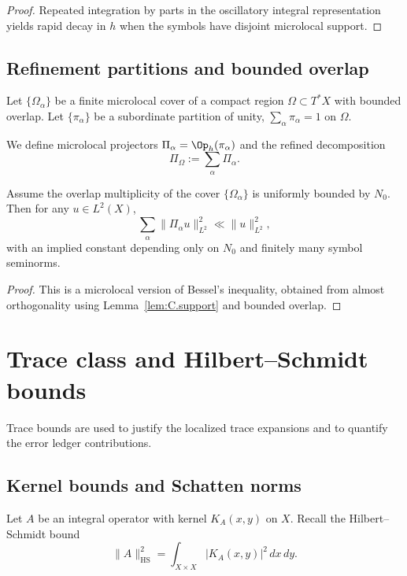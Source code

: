 \begin{proof}
Repeated integration by parts in the oscillatory integral representation yields rapid decay in $h$ when the symbols
have disjoint microlocal support.
\end{proof}

\subsection{Refinement partitions and bounded overlap}
\label{subsec:C.partition}

Let $\{\Omega_\alpha\}$ be a finite microlocal cover of a compact region $\Omega\subset T^\ast X$ with bounded overlap.
Let $\{\pi_\alpha\}$ be a subordinate partition of unity, $\sum_\alpha \pi_\alpha=1$ on $\Omega$.

We define microlocal projectors $\Pi_\alpha=\Op_h(\pi_\alpha)$ and the refined decomposition
\[
\Pi_\Omega:=\sum_\alpha \Pi_\alpha.
\]

\begin{proposition}
\label{prop:C.refinement-stability}
Assume the overlap multiplicity of the cover $\{\Omega_\alpha\}$ is uniformly bounded by $N_0$.
Then for any $u\in L^2(X)$,
\[
\sum_\alpha \|\Pi_\alpha u\|_{L^2}^2
\ll
\|u\|_{L^2}^2,
\]
with an implied constant depending only on $N_0$ and finitely many symbol seminorms.
\end{proposition}

\begin{proof}
This is a microlocal version of Bessel's inequality, obtained from almost orthogonality using
Lemma~\ref{lem:C.support} and bounded overlap.
\end{proof}

\section{Trace class and Hilbert--Schmidt bounds}
\label{sec:C.trace-class}

Trace bounds are used to justify the localized trace expansions and to quantify the error ledger contributions.

\subsection{Kernel bounds and Schatten norms}
\label{subsec:C.schatten}

Let $A$ be an integral operator with kernel $K_A(x,y)$ on $X$.
Recall the Hilbert--Schmidt bound
\[
\|A\|_{\mathrm{HS}}^2
=
\int_{X\times X} |K_A(x,y)|^2\,dx\,dy.
\]

